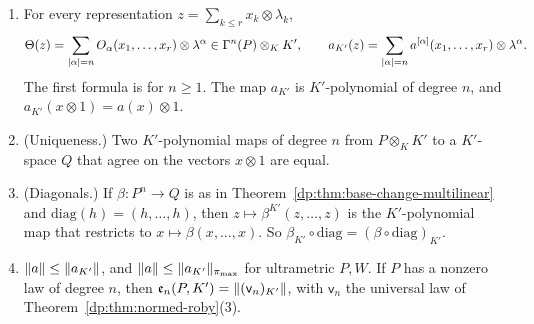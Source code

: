 \begin{proposition}\label{dp:prop:law-extension}
\leavevmode
\begin{enumerate}
\item For every representation $z=\sum_{k\le r}x_k\otimes\lambda_k$,
\begin{equation}\label{dp:bc:formula}
 \Theta(z)=\sum_{\lvert \alpha\rvert=n}O_\alpha(x_1,\dots,x_r)\otimes\lambda^\alpha\in\Gamma^n(P)\otimes_KK',\qquad a_{K'}(z)=\sum_{\lvert \alpha\rvert=n}a^{[\alpha]}(x_1,\dots,x_r)\otimes\lambda^\alpha.
\end{equation}
The first formula is for $n\ge1$. The map $a_{K'}$ is $K'$-polynomial of degree $n$, and $a_{K'}(x\otimes1)=a(x)\otimes1$.
\item \textup{(Uniqueness.)} Two $K'$-polynomial maps of degree $n$ from $P\otimes_KK'$ to a $K'$-space $Q$ that agree on the vectors $x\otimes1$ are equal.
\item \textup{(Diagonals.)} If $\beta\colon P^n\to Q$ is as in Theorem~\ref{dp:thm:base-change-multilinear} and $\mathrm{diag}(h)=(h,\dots,h)$, then $z\mapsto\beta^{K'}(z,\dots,z)$ is the $K'$-polynomial map that restricts to $x\mapsto\beta(x,\dots,x)$. So $\beta_{K'}\circ\mathrm{diag}=(\beta\circ\mathrm{diag})_{K'}$.
\item $\lVert a\rVert\le\lVert a_{K'}\rVert$, and $\lVert a\rVert\le\lVert a_{K'}\rVert_{\pi_{\max}}$ for ultrametric $P,W$. If $P$ has a nonzero law of degree $n$, then $\mathfrak e_n(P,K')=\lVert (\mathsf v_n)_{K'}\rVert$, with $\mathsf v_n$ the universal law of Theorem~\ref{dp:thm:normed-roby}(3).
\end{enumerate}
\end{proposition}

